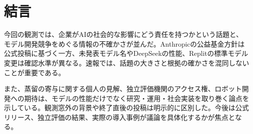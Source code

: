 \section*{結言}
今回の観測では、企業がAIの社会的な影響にどう責任を持つかという話題と、モデル開発競争をめぐる情報の不確かさが並んだ。Anthropicの公益基金方針は公式投稿に基づく一方、未発表モデル名やDeepSeekの性能、Replitの標準モデル変更は確認水準が異なる。速報では、話題の大きさと根拠の確かさを混同しないことが重要である。

また、蒸留の寄与に関する個人の見解、独立評価機関のアクセス権、ロボット開発への期待は、モデルの性能だけでなく研究・運用・社会実装を取り巻く論点を示している。観測窓外の背景や終了直後の投稿は明示的に区別した。今後は公式リリース、独立評価の結果、実際の導入事例が議論を具体化するかが焦点となる。
